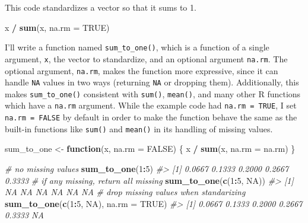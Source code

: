 \documentclass[]{book}
\newenvironment{Shaded}{\begin{snugshade}}{\end{snugshade}}
\newcommand{\CommentTok}[1]{\textcolor[rgb]{0.56,0.35,0.01}{\textit{#1}}}
\newcommand{\ControlFlowTok}[1]{\textcolor[rgb]{0.13,0.29,0.53}{\textbf{#1}}}
\newcommand{\DataTypeTok}[1]{\textcolor[rgb]{0.13,0.29,0.53}{#1}}
\newcommand{\DecValTok}[1]{\textcolor[rgb]{0.00,0.00,0.81}{#1}}
\newcommand{\KeywordTok}[1]{\textcolor[rgb]{0.13,0.29,0.53}{\textbf{#1}}}
\newcommand{\NormalTok}[1]{#1}
\newcommand{\OperatorTok}[1]{\textcolor[rgb]{0.81,0.36,0.00}{\textbf{#1}}}
\newcommand{\OtherTok}[1]{\textcolor[rgb]{0.56,0.35,0.01}{#1}}
\newcommand{\StringTok}[1]{\textcolor[rgb]{0.31,0.60,0.02}{#1}}
\theoremstyle{plain}
\theoremstyle{remark}
\theoremstyle{definition}
\theoremstyle{definition}
\theoremstyle{definition}
\theoremstyle{remark}
\begin{document}
This code standardizes a vector so that it sums to 1.

\begin{Shaded}
\begin{Highlighting}[]
\NormalTok{x }\OperatorTok{/}\StringTok{ }\KeywordTok{sum}\NormalTok{(x, }\DataTypeTok{na.rm =} \OtherTok{TRUE}\NormalTok{)}
\end{Highlighting}
\end{Shaded}

I'll write a function named \texttt{sum\_to\_one()}, which is a function
of a single argument, \texttt{x}, the vector to standardize, and an
optional argument \texttt{na.rm}. The optional argument, \texttt{na.rm},
makes the function more expressive, since it can handle \texttt{NA}
values in two ways (returning \texttt{NA} or dropping them).
Additionally, this makes \texttt{sum\_to\_one()} consistent with
\texttt{sum()}, \texttt{mean()}, and many other R functions which have a
\texttt{na.rm} argument. While the example code had
\texttt{na.rm\ =\ TRUE}, I set \texttt{na.rm\ =\ FALSE} by default in
order to make the function behave the same as the built-in functions
like \texttt{sum()} and \texttt{mean()} in its handling of missing
values.

\begin{Shaded}
\begin{Highlighting}[]
\NormalTok{sum_to_one <-}\StringTok{ }\ControlFlowTok{function}\NormalTok{(x, }\DataTypeTok{na.rm =} \OtherTok{FALSE}\NormalTok{) \{}
\NormalTok{  x }\OperatorTok{/}\StringTok{ }\KeywordTok{sum}\NormalTok{(x, }\DataTypeTok{na.rm =}\NormalTok{ na.rm)}
\NormalTok{\}}
\end{Highlighting}
\end{Shaded}

\begin{Shaded}
\begin{Highlighting}[]
\CommentTok{# no missing values}
\KeywordTok{sum_to_one}\NormalTok{(}\DecValTok{1}\OperatorTok{:}\DecValTok{5}\NormalTok{)}
\CommentTok{#> [1] 0.0667 0.1333 0.2000 0.2667 0.3333}
\CommentTok{# if any missing, return all missing}
\KeywordTok{sum_to_one}\NormalTok{(}\KeywordTok{c}\NormalTok{(}\DecValTok{1}\OperatorTok{:}\DecValTok{5}\NormalTok{, }\OtherTok{NA}\NormalTok{))}
\CommentTok{#> [1] NA NA NA NA NA NA}
\CommentTok{# drop missing values when standarizing}
\KeywordTok{sum_to_one}\NormalTok{(}\KeywordTok{c}\NormalTok{(}\DecValTok{1}\OperatorTok{:}\DecValTok{5}\NormalTok{, }\OtherTok{NA}\NormalTok{), }\DataTypeTok{na.rm =} \OtherTok{TRUE}\NormalTok{)}
\CommentTok{#> [1] 0.0667 0.1333 0.2000 0.2667 0.3333     NA}
\end{Highlighting}
\end{Shaded}
\end{document}
